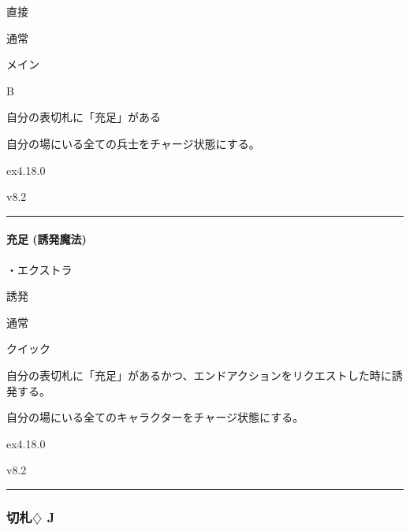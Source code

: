 \documentclass[letterpaper,10pt,dvipdfmx]{sphinxmanual}
\begin{document}
\sphinxAtStartPar
{} 直接

\sphinxAtStartPar
{} 通常

\sphinxAtStartPar
{} メイン

\sphinxAtStartPar
{} B

\sphinxAtStartPar
{}

\sphinxAtStartPar
自分の表切札に「充足」がある

\sphinxAtStartPar
{}

\sphinxAtStartPar
自分の場にいる全ての兵士をチャージ状態にする。

\sphinxAtStartPar
{}  ex4.18.0

\sphinxAtStartPar
{}  v8.2


\bigskip\hrule\bigskip



\paragraph{充足 (誘発魔法)}
\label{\detokenize{auto/frameActionlist:act-satisfaction}}\label{\detokenize{auto/frameActionlist:id66}}
\sphinxAtStartPar
{}

\sphinxAtStartPar
・エクストラ

\sphinxAtStartPar
{} 誘発

\sphinxAtStartPar
{} 通常

\sphinxAtStartPar
{} クイック

\sphinxAtStartPar
{}

\sphinxAtStartPar
自分の表切札に「充足」があるかつ、エンドアクションをリクエストした時に誘発する。

\sphinxAtStartPar
{}

\sphinxAtStartPar
自分の場にいる全てのキャラクターをチャージ状態にする。

\sphinxAtStartPar
{}  ex4.18.0

\sphinxAtStartPar
{}  v8.2


\bigskip\hrule\bigskip



\subsubsection{切札{\normalsize $\diamondsuit$} J}
\label{\detokenize{auto/frameActionlist:id67}}
\end{document}
